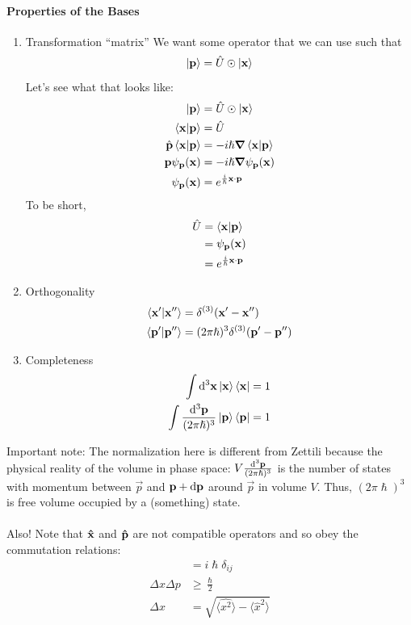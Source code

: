 \documentclass[a4paper]{article}
\begin{document}
\paragraph{Properties of the Bases}
\begin{enumerate}
\item Transformation ``matrix''
We want some operator that we can use such that
\[ \bket{\vec{p}} = \hat{U} \odot \bket{\vec{x}} \]
Let's see what that looks like:
\begin{align*}
	\bket{\vec{p}} &= \hat{U} \odot \bket{\vec{x}}\\
	\braket{\vec{x}}{\vec{p}} &= \hat{U}\\
	\hat{\vec{p}}\braket{\vec{x}}{\vec{p}} &=
		-i\hslash\del\braket{\vec{x}}{\vec{p}}\\
	\vec{p}\psi_{\vec{p}}(\vec{x}) &=
		-i\hslash\del\psi_{\vec{p}}(\vec{x})\\
	\psi_{\vec{p}}(\vec{x}) &= e^{\frac{i}{\hslash}\vec{x}\cdot\vec{p}}
\end{align*}
To be short,
\begin{align*}
	\hat{U} &= \braket{\vec{x}}{\vec{p}}\\
		&= \psi_{\vec{p}}(\vec{x})\\
		&= e^{\frac{i}{\hslash}\vec{x}\cdot\vec{p}}
\end{align*}

\item Orthogonality
\begin{align*}
	\braket{\vec{x}'}{\vec{x}''} &= \delta^{(3)}(\vec{x}'-\vec{x}'')\\
	\braket{\vec{p}'}{\vec{p}''} &=
		(2\pi\hslash)^3\delta^{(3)}(\vec{p}'-\vec{p}'')
\end{align*}

\item Completeness
\begin{align*}
	\int \d^3\vec{x} \bket{\vec{x}}\brak{\vec{x}} &= 1\\
	\int \frac{\d^3\vec{p}}{(2\pi\hslash)^3}
		\bket{\vec{p}}\brak{\vec{p}} &= 1
\end{align*}

\end{enumerate}
Important note: The normalization here is different from Zettili because the
physical reality of the volume in phase space:
$V\frac{\d^3\vec{p}}{(2\pi\hslash)^3}$ is the number of states with momentum
between $\vec{p}$ and $\vec{p} + \d\vec{p}$ around $\vec{p}$ in volume $V$.
Thus, $(2\pi\hslash)^3$ is free volume occupied by a (something) state.\\~\\
Also! Note that $\vhat{x}$ and $\vhat{p}$ are not compatible operators and so
obey the commutation relations:
\begin{align*}
	[\vhat{x}_i,\vhat{p}_j] &= i\hslash\delta_{ij}\\
	\Delta x\Delta p &\geq \frac{\hslash}{2}\\
	\Delta x &= \sqrt{\langle\hat{x^2}\rangle - \langle\hat{x}^2\rangle}
\end{align*}
\end{document}
